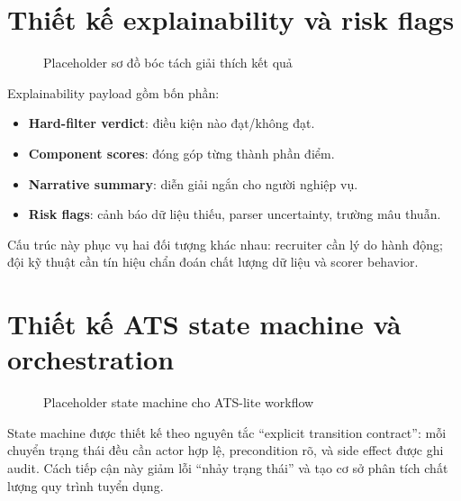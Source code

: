 \section{Thiết kế explainability và risk flags}

\begin{figure}[H]
\centering
{}
\caption{Placeholder sơ đồ bóc tách giải thích kết quả}
\label{fig:explainability-breakdown-placeholder}
\end{figure}

Explainability payload gồm bốn phần:

\begin{itemize}
  \item \textbf{Hard-filter verdict}: điều kiện nào đạt/không đạt.
  \item \textbf{Component scores}: đóng góp từng thành phần điểm.
  \item \textbf{Narrative summary}: diễn giải ngắn cho người nghiệp vụ.
  \item \textbf{Risk flags}: cảnh báo dữ liệu thiếu, parser uncertainty, trường mâu thuẫn.
\end{itemize}

Cấu trúc này phục vụ hai đối tượng khác nhau: recruiter cần lý do hành động; đội kỹ thuật cần tín hiệu chẩn đoán chất lượng dữ liệu và scorer behavior.

\section{Thiết kế ATS state machine và orchestration}

\begin{figure}[H]
\centering
{}
\caption{Placeholder state machine cho ATS-lite workflow}
\label{fig:state-machine-placeholder}
\end{figure}

State machine được thiết kế theo nguyên tắc ``explicit transition contract'': mỗi chuyển trạng thái đều cần actor hợp lệ, precondition rõ, và side effect được ghi audit. Cách tiếp cận này giảm lỗi ``nhảy trạng thái'' và tạo cơ sở phân tích chất lượng quy trình tuyển dụng.

